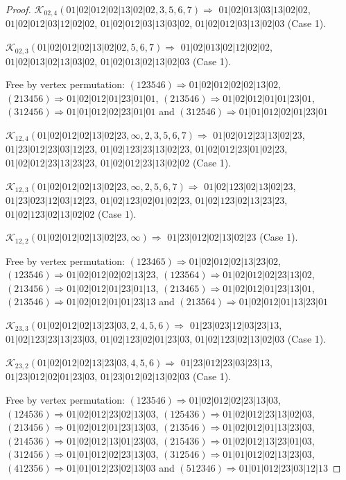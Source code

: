 \documentclass[12pt]{article}
\theoremstyle{plain}
\theoremstyle{definition}
\theoremstyle{remark}
\newcommand{\fancy}[1]{\mathcal{#1}}
\def\K{\fancy{K}}
\begin{document}
\begin{proof}
	
	
	\bigskip
	
	$\K_{02,4}(01|02|012|02|13|02|02,3, 5, 6, 7)\Rightarrow $ $01|02|013|03|13|02|02$, $01|02|012|03|12|02|02$, $01|02|012|03|13|03|02$, $01|02|012|03|13|02|03$ (Case 1).
	
	$\K_{02,3}(01|02|012|02|13|02|02,5, 6, 7)\Rightarrow $ $01|02|013|02|12|02|02$, $01|02|013|02|13|03|02$, $01|02|013|02|13|02|03$ (Case 1).
	
	
	
	Free by vertex permutation: $(1 2 3 5 4 6)\Rightarrow 01|02|012|02|02|13|02$, $(2 1 3 4 5 6)\Rightarrow 01|02|012|01|23|01|01$, $(2 1 3 5 4 6)\Rightarrow 01|02|012|01|01|23|01$, $(3 1 2 4 5 6)\Rightarrow 01|01|012|02|23|01|01$ and $(3 1 2 5 4 6)\Rightarrow 01|01|012|02|01|23|01$
	
	
	
	\bigskip
	
	$\K_{12,4}(01|02|012|02|13|02|23,\infty,2, 3, 5, 6, 7)\Rightarrow $ $01|02|012|23|13|02|23$, $01|23|012|23|03|12|23$, $01|02|123|23|13|02|23$, $01|02|012|23|01|02|23$, $01|02|012|23|13|23|23$, $01|02|012|23|13|02|02$ (Case 1).
	
	$\K_{12,3}(01|02|012|02|13|02|23,\infty,2, 5, 6, 7)\Rightarrow $ $01|02|123|02|13|02|23$, $01|23|023|12|03|12|23$, $01|02|123|02|01|02|23$, $01|02|123|02|13|23|23$, $01|02|123|02|13|02|02$ (Case 1).
	
	$\K_{12,2}(01|02|012|02|13|02|23,\infty)\Rightarrow $ $01|23|012|02|13|02|23$ (Case 1).
	
	
	
	Free by vertex permutation: $(1 2 3 4 6 5)\Rightarrow 01|02|012|02|13|23|02$, $(1 2 3 5 4 6)\Rightarrow 01|02|012|02|02|13|23$, $(1 2 3 5 6 4)\Rightarrow 01|02|012|02|23|13|02$, $(2 1 3 4 5 6)\Rightarrow 01|02|012|01|23|01|13$, $(2 1 3 4 6 5)\Rightarrow 01|02|012|01|23|13|01$, $(2 1 3 5 4 6)\Rightarrow 01|02|012|01|01|23|13$ and $(2 1 3 5 6 4)\Rightarrow 01|02|012|01|13|23|01$
	
	
	
	\bigskip
	
	$\K_{23,3}(01|02|012|02|13|23|03,2, 4, 5, 6)\Rightarrow $ $01|23|023|12|03|23|13$, $01|02|123|23|13|23|03$, $01|02|123|02|01|23|03$, $01|02|123|02|13|02|03$ (Case 1).
	
	$\K_{23,2}(01|02|012|02|13|23|03,4, 5, 6)\Rightarrow $ $01|23|012|23|03|23|13$, $01|23|012|02|01|23|03$, $01|23|012|02|13|02|03$ (Case 1).
	
	
	
	Free by vertex permutation: $(1 2 3 5 4 6)\Rightarrow 01|02|012|02|23|13|03$, $(1 2 4 5 3 6)\Rightarrow 01|02|012|23|02|13|03$, $(1 2 5 4 3 6)\Rightarrow 01|02|012|23|13|02|03$, $(2 1 3 4 5 6)\Rightarrow 01|02|012|01|23|13|03$, $(2 1 3 5 4 6)\Rightarrow 01|02|012|01|13|23|03$, $(2 1 4 5 3 6)\Rightarrow 01|02|012|13|01|23|03$, $(2 1 5 4 3 6)\Rightarrow 01|02|012|13|23|01|03$, $(3 1 2 4 5 6)\Rightarrow 01|01|012|02|23|13|03$, $(3 1 2 5 4 6)\Rightarrow 01|01|012|02|13|23|03$, $(4 1 2 3 5 6)\Rightarrow 01|01|012|23|02|13|03$ and $(5 1 2 3 4 6)\Rightarrow 01|01|012|23|03|12|13$
	

\end{proof}
\end{document}
